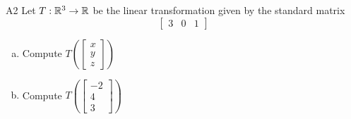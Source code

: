 \begin{problem}{A2}
Let $T: \mathbb{R}^3 \rightarrow \mathbb{R}$ be the linear transformation given by the standard matrix
$$\begin{bmatrix} 3 & 0 & 1 \end{bmatrix}$$
\begin{enumerate}[(a)]
\item Compute \( T\left( \begin{bmatrix}x\\ y \\ z  \end{bmatrix} \right) \)
\item Compute \( T\left( \begin{bmatrix} -2 \\ 4 \\ 3\end{bmatrix} \right) \)
\end{enumerate}
\end{problem}

